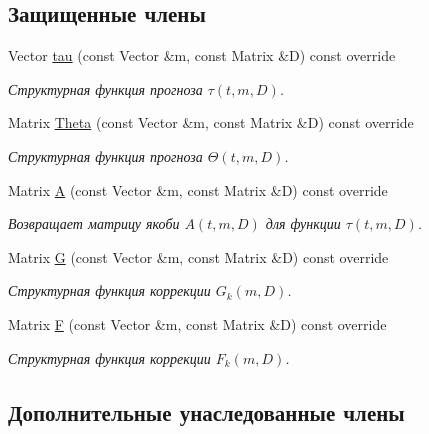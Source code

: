 \subsection*{Защищенные члены}
\begin{DoxyCompactItemize}
\item 
Vector \hyperlink{class_tasks_1_1_continuous_discrete_1_1_van_der_pol_gauss_acfe935d9f4f452f3e10cb5f41fc8530a}{tau} (const Vector \&m, const Matrix \&D) const override
\begin{DoxyCompactList}\small\item\em Структурная функция прогноза $\tau(t, m, D)$. \end{DoxyCompactList}\item 
Matrix \hyperlink{class_tasks_1_1_continuous_discrete_1_1_van_der_pol_gauss_addb8066d1f4701c0c453d07ffa8631ff}{Theta} (const Vector \&m, const Matrix \&D) const override
\begin{DoxyCompactList}\small\item\em Структурная функция прогноза $\Theta(t,m,D)$. \end{DoxyCompactList}\item 
Matrix \hyperlink{class_tasks_1_1_continuous_discrete_1_1_van_der_pol_gauss_acb431d1a24b276610f6b7c7ff343fb9f}{A} (const Vector \&m, const Matrix \&D) const override
\begin{DoxyCompactList}\small\item\em Возвращает матрицу якоби $A(t, m, D)$ для функции $\tau(t, m, D)$. \end{DoxyCompactList}\item 
Matrix \hyperlink{class_tasks_1_1_continuous_discrete_1_1_van_der_pol_gauss_a757eb311b72b3cabcee59eab9d732de5}{G} (const Vector \&m, const Matrix \&D) const override
\begin{DoxyCompactList}\small\item\em Структурная функция коррекции $G_k(m, D)$. \end{DoxyCompactList}\item 
Matrix \hyperlink{class_tasks_1_1_continuous_discrete_1_1_van_der_pol_gauss_adbd6671eb347348b68db28d899484336}{F} (const Vector \&m, const Matrix \&D) const override
\begin{DoxyCompactList}\small\item\em Структурная функция коррекции $F_k(m, D)$. \end{DoxyCompactList}\end{DoxyCompactItemize}
\subsection*{Дополнительные унаследованные члены}



